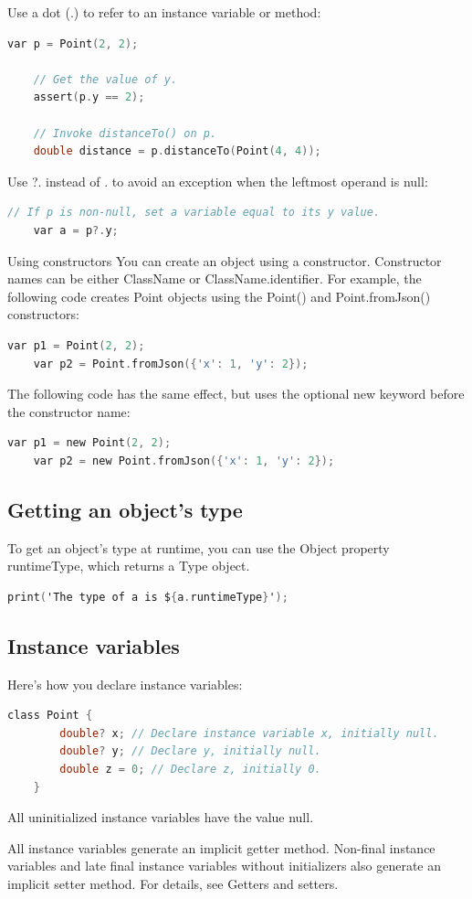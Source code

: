 Use a dot (.) to refer to an instance variable or method:
\begin{lstlisting}[language=C]
	var p = Point(2, 2);
	
	// Get the value of y.
	assert(p.y == 2);
	
	// Invoke distanceTo() on p.
	double distance = p.distanceTo(Point(4, 4));
\end{lstlisting}
Use ?. instead of . to avoid an exception when the leftmost operand is null:
\begin{lstlisting}[language=C]
	// If p is non-null, set a variable equal to its y value.
	var a = p?.y;
\end{lstlisting}
Using constructors
You can create an object using a constructor. Constructor names can be either ClassName or ClassName.identifier. For example, the following code creates Point objects using the Point() and Point.fromJson() constructors:
\begin{lstlisting}[language=C]
	var p1 = Point(2, 2);
	var p2 = Point.fromJson({'x': 1, 'y': 2});
\end{lstlisting}
The following code has the same effect, but uses the optional new keyword before the constructor name:
\begin{lstlisting}[language=C]
	var p1 = new Point(2, 2);
	var p2 = new Point.fromJson({'x': 1, 'y': 2});
\end{lstlisting}
\subsection{Getting an object's type}
To get an object's type at runtime, you can use the Object property runtimeType, which returns a Type object.

\begin{lstlisting}[language=C]
	print('The type of a is ${a.runtimeType}');
\end{lstlisting}
\subsection{Instance variables}
Here's how you declare instance variables:
\begin{lstlisting}[language=C]
	class Point {
		double? x; // Declare instance variable x, initially null.
		double? y; // Declare y, initially null.
		double z = 0; // Declare z, initially 0.
	}
\end{lstlisting}
All uninitialized instance variables have the value null.

All instance variables generate an implicit getter method. Non-final instance variables and late final instance variables without initializers also generate an implicit setter method. For details, see Getters and setters.

